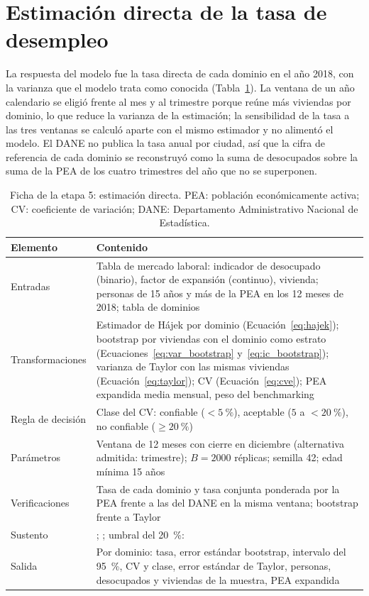 \section{Estimación directa de la tasa de desempleo}
\label{sec:met_directa}

La respuesta del modelo fue la tasa directa de cada dominio en el año 2018, con la varianza que el modelo trata como conocida (Tabla~\ref{tab:met_directa}). La ventana de un año calendario se eligió frente al mes y al trimestre porque reúne más viviendas por dominio, lo que reduce la varianza de la estimación; la sensibilidad de la tasa a las tres ventanas se calculó aparte con el mismo estimador y no alimentó el modelo. El DANE no publica la tasa anual por ciudad, así que la cifra de referencia de cada dominio se reconstruyó como la suma de desocupados sobre la suma de la PEA de los cuatro trimestres del año que no se superponen.

\begin{table}[!htbp]
\centering
\small
\caption[Ficha de la etapa 5: estimación directa]{Ficha de la etapa 5: estimación directa. PEA: población económicamente activa; CV: coeficiente de variación; DANE: Departamento Administrativo Nacional de Estadística.}
\label{tab:met_directa}
\renewcommand{\arraystretch}{1.15}
\begin{tabularx}{\linewidth}{>{\raggedright\arraybackslash}p{2.8cm} >{\raggedright\arraybackslash}X}
\toprule
Elemento & Contenido \\
\midrule
Entradas & Tabla de mercado laboral: indicador de desocupado (binario), factor de expansión (continuo), vivienda; personas de 15 años y más de la PEA en los 12 meses de 2018; tabla de dominios \\
Transformaciones & Estimador de Hájek por dominio (Ecuación~\ref{eq:hajek}); bootstrap por viviendas con el dominio como estrato (Ecuaciones~\ref{eq:var_bootstrap} y~\ref{eq:ic_bootstrap}); varianza de Taylor con las mismas viviendas (Ecuación~\ref{eq:taylor}); CV (Ecuación~\ref{eq:cve}); PEA expandida media mensual, peso del benchmarking \\
Regla de decisión & Clase del CV: confiable ($<5~\%$), aceptable ($5$ a $<20~\%$), no confiable ($\geq 20~\%$) \\
Parámetros & Ventana de 12 meses con cierre en diciembre (alternativa admitida: trimestre); $B = \num{2000}$ réplicas; semilla 42; edad mínima 15 años \\
Verificaciones & Tasa de cada dominio y tasa conjunta ponderada por la PEA frente a las del DANE en la misma ventana; bootstrap frente a Taylor \\
Sustento & \cite[pp.~21--22, 26--27, 61]{morales2021smallarea}; \cite[pp.~12, 15]{DANE_GEIH_Metodologia2016}; umbral del 20~\%: \cite[pp.~14--15]{Molina2019} \\
Salida & Por dominio: tasa, error estándar bootstrap, intervalo del 95~\%, CV y clase, error estándar de Taylor, personas, desocupados y viviendas de la muestra, PEA expandida \\
\bottomrule
\end{tabularx}
\end{table}

